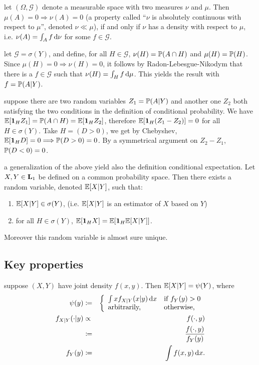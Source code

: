 \documentclass{article}
\begin{document}
\newcommand\othersigma{{\mathcal G}}

 let $(\Omega, \othersigma)$ denote a measurable space with two measures $\nu$ and $\mu$. Then $\mu(A) = 0 \Rightarrow \nu(A) = 0$ (a property called ``$\nu$ is absolutely continuous with respect to $\mu$'', denoted $\nu \ll \mu$), if and only if $\nu$ has a density with respect to $\mu$, i.e. $\nu(A) = \int_A f \ud \nu$ for some $f \in \othersigma$.

 let $\othersigma = \sigma(Y)$, and define, for all $H \in \othersigma$, $\nu(H) = \P(A \cap H)$ and $\mu(H) = \P(H)$. Since $\mu(H) = 0 \Longrightarrow \nu(H) = 0$, it follows by Radon-Lebesgue-Nikodym that there is a $f \in \othersigma$ such that $\nu(H) = \int_H f \ud \mu$. This yields the result with $f = \P(A|Y)$. 

 suppose there are two random variables $Z_1 = \P(A|Y)$ and another one $Z_2$ both satisfying the two conditions in the definition of conditional probability. We have $\E[\1_H Z_1] = \P(A\cap H) = \E[\1_H Z_2]$, therefore $\E[\1_H (Z_1 - Z_2)] = 0$ for all $H \in \sigma(Y)$. Take $H = (D > 0)$, we get by Chebyshev, $\E[\1_H D] = 0 \Longrightarrow \P(D > 0) = 0$. By a symmetrical argument on $Z_2 - Z_1$, $\P(D < 0) = 0$.

 a generalization of the above yield also the definition conditional expectation.  Let $X, Y \in \L_1$ be defined on a common probability space. Then there exists a random variable, denoted $\E[X|Y]$, such that:
\begin{enumerate}
\item $\E[X|Y] \in \sigma(Y)$, (i.e. $\E[X|Y]$ is an estimator of $X$ based on $Y$)
\item for all $H \in \sigma(Y)$, $\E[ \1_H X ] = \E[ \1_H \E[X|Y] ]$.
\end{enumerate} 
Moreover this random variable is almost sure unique.


\subsection{Key properties}

 suppose $(X, Y)$ have joint density $f(x,y)$. Then $\E[X|Y] = \psi(Y)$, where 
\begin{eqnarray*} 
\psi(y) &\defeq& \bracearraycond{\int x f_{X|Y}(x|y) \ud x &\text{if }f_Y(y) > 0 \\ \text{arbitrarily,} &\text{otherwise,}} \\
 f_{X|Y}(\cdot|y) &\propto& f(\cdot, y) \\
&\defeq& \frac{f(\cdot,y)}{f_Y(y)} \\
f_Y(y) &\defeq& \int f(x, y) \ud x.
\end{eqnarray*}
\end{document}
